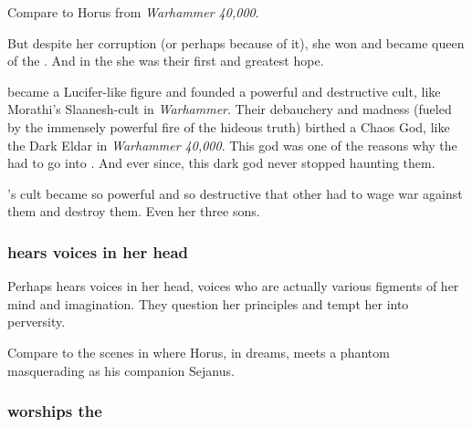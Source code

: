 Compare to Horus from \emph{Warhammer 40,000}.

But despite her corruption (or perhaps because of it), she won and became queen of the \dragons. 
And in the \firstbanewar{} she was their first and greatest hope. 

\Tiamat became a Lucifer-like figure and founded a powerful and destructive cult, like Morathi's Slaanesh-cult in \emph{Warhammer}. 
Their debauchery and madness (fueled by the immensely powerful fire of the hideous truth) birthed a Chaos God, like the Dark Eldar in \emph{Warhammer 40,000}. 
This god was one of the reasons why the \dragons had to go into .
And ever since, this dark god never stopped haunting them. 

\Tiamat's cult became so powerful and so destructive that other \dragons had to wage war against them and destroy them.
Even her three sons. 





\subsubsection{\Tiamat{} hears voices in her head}
Perhaps \Tiamat{} hears voices in her head, voices who are actually various figments of her mind and imagination. 
They question her principles and tempt her into perversity. 

Compare to the scenes in  where Horus, in dreams, meets a phantom masquerading as his companion Sejanus. 





\subsubsection{\Tiamat{} worships the \xss}

